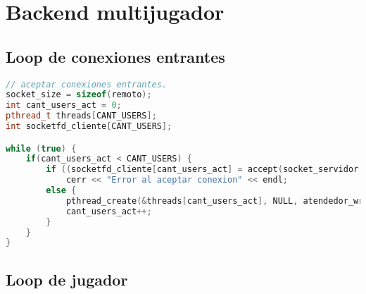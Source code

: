 \section{Backend multijugador}

\subsection{Loop de conexiones entrantes}

\begin{lstlisting}[language=C++, breaklines=true]
// aceptar conexiones entrantes.
socket_size = sizeof(remoto);
int cant_users_act = 0;
pthread_t threads[CANT_USERS];
int socketfd_cliente[CANT_USERS];

while (true) {
	if(cant_users_act < CANT_USERS) {
		if ((socketfd_cliente[cant_users_act] = accept(socket_servidor, (struct sockaddr*) &remoto, (socklen_t*) &socket_size)) == -1)
			cerr << "Error al aceptar conexion" << endl;
		else {
			pthread_create(&threads[cant_users_act], NULL, atendedor_wrapper, &socketfd_cliente[cant_users_act]);
			cant_users_act++;
		}
	}
}
\end{lstlisting}

\subsection{Loop de jugador}

